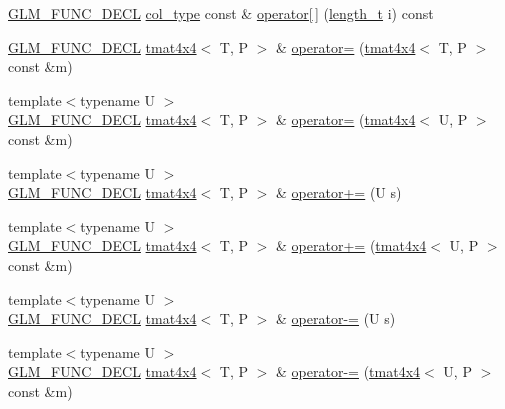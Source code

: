 \begin{DoxyCompactItemize}
\hyperlink{setup_8hpp_ab2d052de21a70539923e9bcbf6e83a51}{G\+L\+M\+\_\+\+F\+U\+N\+C\+\_\+\+D\+E\+CL} \hyperlink{structglm_1_1detail_1_1tmat4x4_ade9e794ddd9c2758005f29ddb84e320f}{col\+\_\+type} const  \& \hyperlink{structglm_1_1detail_1_1tmat4x4_a944cec314978830da23bff87a465b913}{operator\mbox{[}$\,$\mbox{]}} (\hyperlink{namespaceglm_a090a0de2260835bee80e71a702492ed9}{length\+\_\+t} i) const
\item 
\hyperlink{setup_8hpp_ab2d052de21a70539923e9bcbf6e83a51}{G\+L\+M\+\_\+\+F\+U\+N\+C\+\_\+\+D\+E\+CL} \hyperlink{structglm_1_1detail_1_1tmat4x4}{tmat4x4}$<$ T, P $>$ \& \hyperlink{structglm_1_1detail_1_1tmat4x4_a64e75fbb008a4ac755ddf4f0139b56f2}{operator=} (\hyperlink{structglm_1_1detail_1_1tmat4x4}{tmat4x4}$<$ T, P $>$ const \&m)
\item 
{\footnotesize template$<$typename U $>$ }\\\hyperlink{setup_8hpp_ab2d052de21a70539923e9bcbf6e83a51}{G\+L\+M\+\_\+\+F\+U\+N\+C\+\_\+\+D\+E\+CL} \hyperlink{structglm_1_1detail_1_1tmat4x4}{tmat4x4}$<$ T, P $>$ \& \hyperlink{structglm_1_1detail_1_1tmat4x4_a43fc3af37580faf4fa172ab4ccc168ad}{operator=} (\hyperlink{structglm_1_1detail_1_1tmat4x4}{tmat4x4}$<$ U, P $>$ const \&m)
\item 
{\footnotesize template$<$typename U $>$ }\\\hyperlink{setup_8hpp_ab2d052de21a70539923e9bcbf6e83a51}{G\+L\+M\+\_\+\+F\+U\+N\+C\+\_\+\+D\+E\+CL} \hyperlink{structglm_1_1detail_1_1tmat4x4}{tmat4x4}$<$ T, P $>$ \& \hyperlink{structglm_1_1detail_1_1tmat4x4_ad89260d8ab56b889c7c926b0f51bb589}{operator+=} (U s)
\item 
{\footnotesize template$<$typename U $>$ }\\\hyperlink{setup_8hpp_ab2d052de21a70539923e9bcbf6e83a51}{G\+L\+M\+\_\+\+F\+U\+N\+C\+\_\+\+D\+E\+CL} \hyperlink{structglm_1_1detail_1_1tmat4x4}{tmat4x4}$<$ T, P $>$ \& \hyperlink{structglm_1_1detail_1_1tmat4x4_a4b67c9c0f2f7eca42f6d41a5f91fcdf5}{operator+=} (\hyperlink{structglm_1_1detail_1_1tmat4x4}{tmat4x4}$<$ U, P $>$ const \&m)
\item 
{\footnotesize template$<$typename U $>$ }\\\hyperlink{setup_8hpp_ab2d052de21a70539923e9bcbf6e83a51}{G\+L\+M\+\_\+\+F\+U\+N\+C\+\_\+\+D\+E\+CL} \hyperlink{structglm_1_1detail_1_1tmat4x4}{tmat4x4}$<$ T, P $>$ \& \hyperlink{structglm_1_1detail_1_1tmat4x4_acfc4f485eb7cd93ed168d924582e89ba}{operator-\/=} (U s)
\item 
{\footnotesize template$<$typename U $>$ }\\\hyperlink{setup_8hpp_ab2d052de21a70539923e9bcbf6e83a51}{G\+L\+M\+\_\+\+F\+U\+N\+C\+\_\+\+D\+E\+CL} \hyperlink{structglm_1_1detail_1_1tmat4x4}{tmat4x4}$<$ T, P $>$ \& \hyperlink{structglm_1_1detail_1_1tmat4x4_a47a07eac46c9ed5021446e40bbfb8d8e}{operator-\/=} (\hyperlink{structglm_1_1detail_1_1tmat4x4}{tmat4x4}$<$ U, P $>$ const \&m)

\end{DoxyCompactItemize}
